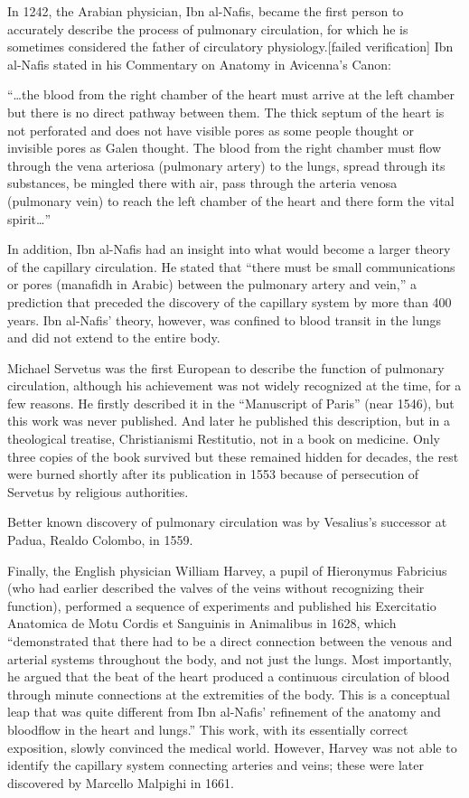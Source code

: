 In 1242, the Arabian physician, Ibn al-Nafis, became the first person to accurately describe the process of pulmonary circulation, for which he is sometimes considered the father of circulatory physiology.{[}failed verification{]} Ibn al-Nafis stated in his Commentary on Anatomy in Avicenna's Canon:

``\ldots the blood from the right chamber of the heart must arrive at the left chamber but there is no direct pathway between them. The thick septum of the heart is not perforated and does not have visible pores as some people thought or invisible pores as Galen thought. The blood from the right chamber must flow through the vena arteriosa (pulmonary artery) to the lungs, spread through its substances, be mingled there with air, pass through the arteria venosa (pulmonary vein) to reach the left chamber of the heart and there form the vital spirit\ldots{}''

In addition, Ibn al-Nafis had an insight into what would become a larger theory of the capillary circulation. He stated that ``there must be small communications or pores (manafidh in Arabic) between the pulmonary artery and vein,'' a prediction that preceded the discovery of the capillary system by more than 400 years. Ibn al-Nafis' theory, however, was confined to blood transit in the lungs and did not extend to the entire body.

Michael Servetus was the first European to describe the function of pulmonary circulation, although his achievement was not widely recognized at the time, for a few reasons. He firstly described it in the ``Manuscript of Paris'' (near 1546), but this work was never published. And later he published this description, but in a theological treatise, Christianismi Restitutio, not in a book on medicine. Only three copies of the book survived but these remained hidden for decades, the rest were burned shortly after its publication in 1553 because of persecution of Servetus by religious authorities.

Better known discovery of pulmonary circulation was by Vesalius's successor at Padua, Realdo Colombo, in 1559.

Finally, the English physician William Harvey, a pupil of Hieronymus Fabricius (who had earlier described the valves of the veins without recognizing their function), performed a sequence of experiments and published his Exercitatio Anatomica de Motu Cordis et Sanguinis in Animalibus in 1628, which ``demonstrated that there had to be a direct connection between the venous and arterial systems throughout the body, and not just the lungs. Most importantly, he argued that the beat of the heart produced a continuous circulation of blood through minute connections at the extremities of the body. This is a conceptual leap that was quite different from Ibn al-Nafis' refinement of the anatomy and bloodflow in the heart and lungs.'' This work, with its essentially correct exposition, slowly convinced the medical world. However, Harvey was not able to identify the capillary system connecting arteries and veins; these were later discovered by Marcello Malpighi in 1661.

